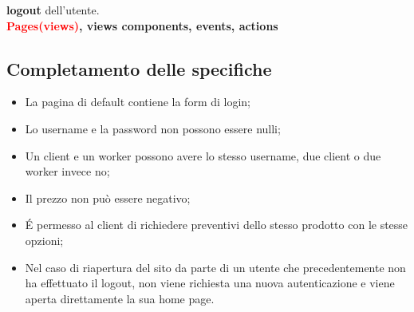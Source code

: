 \documentclass[a4paper, 12pt]{article}
\begin{document}
\textbf{\textcolor{myBrown}{logout}} dell’utente.\\

\noindent \textbf{\textcolor{red}{Pages(views)}, \textcolor{myGreen}{views components}, \textcolor{myBlue}{events}, \textcolor{myBrown}{actions}}
\subsection{Completamento delle specifiche}
\begin{itemize}
	\item La pagina di default contiene la form di login;
	\item Lo username e la password non possono essere nulli;
	\item Un client e un worker possono avere lo stesso username, due client o due worker invece no;
	\item Il prezzo non può essere negativo;
	\item \'E permesso al client di richiedere preventivi dello stesso prodotto con le stesse opzioni;
	\item Nel caso di riapertura del sito da parte di un utente che precedentemente non ha effettuato il logout, non viene richiesta una nuova autenticazione e viene aperta direttamente la sua home page.
\end{itemize}
\newpage
\end{document}
